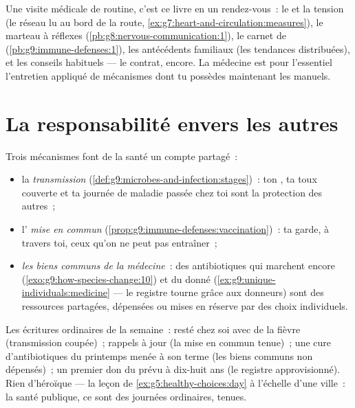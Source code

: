 \begin{example}\label{ex:g9:our-responsibility:checkup}
Une visite médicale de routine, c'est ce livre en un
rendez-vous~: le  et la tension (le réseau lu au bord
de la route, \cref{ex:g7:heart-and-circulation:measures}),
le marteau à réflexes
(\cref{pb:g8:nervous-communication:1}), le carnet de
 (\cref{pb:g9:immune-defenses:1}), les
antécédents familiaux (les tendances distribuées), et les
conseils habituels --- le contrat, encore. La médecine est
pour l'essentiel l'entretien appliqué de mécanismes dont tu
possèdes maintenant les manuels.
\end{example}

\section{La responsabilité envers les autres}

\begin{proposition}\label{prop:g9:our-responsibility:others}
Trois mécanismes font de la santé un compte partagé~:
\begin{itemize}
  \item la \emph{transmission}
        (\cref{def:g9:microbes-and-infection:stages})~: ton
        , ta toux couverte et ta journée de maladie
        passée chez toi sont la protection des autres~;
  \item l'\emph{ mise en commun}
        (\cref{prop:g9:immune-defenses:vaccination})~: ta
         garde, à travers toi, ceux qu'on ne peut
        pas entraîner~;
  \item \emph{les biens communs de la médecine}~: des
        antibiotiques qui marchent encore
        (\cref{exo:g9:how-species-change:10}) et du 
        donné (\cref{ex:g9:unique-individuals:medicine} ---
        le registre tourne grâce aux donneurs) sont des
        ressources partagées, dépensées ou mises en réserve
        par des choix individuels.
\end{itemize}
\end{proposition}
\admitted

\begin{example}\label{ex:g9:our-responsibility:account}
Les écritures ordinaires de la semaine~: resté chez soi avec
de la fièvre (transmission coupée)~; rappels à jour (la
mise en commun tenue)~; une cure d'antibiotiques du
printemps menée à son terme (les biens communs non
dépensés)~; un premier don du  prévu à dix-huit ans (le
registre approvisionné). Rien d'héroïque --- la leçon de
\cref{ex:g5:healthy-choices:day} à l'échelle d'une ville~:
la santé publique, ce sont des journées ordinaires, tenues.
\end{example}

